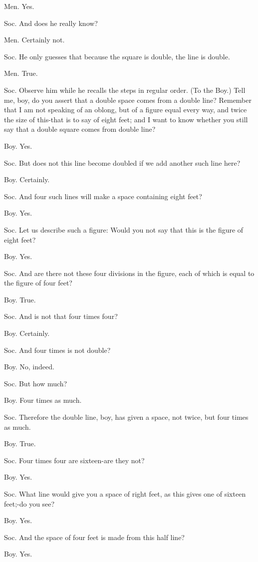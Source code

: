 Men. Yes. 

Soc. And does he really know? 

Men. Certainly not. 

Soc. He only guesses that because the square is double, the line is
double. 

Men. True. 

Soc. Observe him while he recalls the steps in regular order. (To
the Boy.) Tell me, boy, do you assert that a double space comes from
a double line? Remember that I am not speaking of an oblong, but of
a figure equal every way, and twice the size of this-that is to say
of eight feet; and I want to know whether you still say that a double
square comes from double line? 

Boy. Yes. 

Soc. But does not this line become doubled if we add another such
line here? 

Boy. Certainly. 

Soc. And four such lines will make a space containing eight feet?

Boy. Yes. 

Soc. Let us describe such a figure: Would you not say that this is
the figure of eight feet? 

Boy. Yes. 

Soc. And are there not these four divisions in the figure, each of
which is equal to the figure of four feet? 

Boy. True. 

Soc. And is not that four times four? 

Boy. Certainly. 

Soc. And four times is not double? 

Boy. No, indeed. 

Soc. But how much? 

Boy. Four times as much. 

Soc. Therefore the double line, boy, has given a space, not twice,
but four times as much. 

Boy. True. 

Soc. Four times four are sixteen-are they not? 

Boy. Yes. 

Soc. What line would give you a space of right feet, as this gives
one of sixteen feet;-do you see? 

Boy. Yes. 

Soc. And the space of four feet is made from this half line?

Boy. Yes. 

